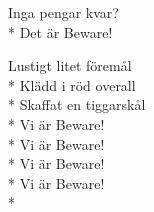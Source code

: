\begin{SongText}[Vi är Beware!]
\begin{SongVerse}
        Inga pengar kvar?\\*%
        Det är Beware!
    \end{SongVerse}
    \begin{SongVerse}
        Lustigt litet föremål\\*%
        Klädd i röd overall\\*%
        Skaffat en tiggarskål\\*%
        Vi är Beware!\\*%
        Vi är Beware!\\*%
        Vi är Beware!\\*%
        Vi är Beware!\\*%
    \end{SongVerse}
\end{SongText}
